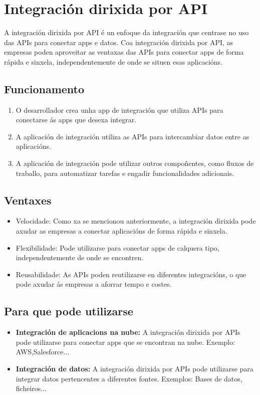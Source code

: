 \section{Integración dirixida por API}
\begin{flushleft}
    A integración dirixida por API é un enfoque da integración que centrase no uso das APIs para conectar apps e datos. Coa integración dirixida por API, as empresas poden aproveitar as ventaxas das APIs para conectar apps de forma rápida e sinxela, independentemente de onde se situen esas aplicacións. \\
    \subsection{Funcionamento }
    \begin{enumerate}
        \item O desarrollador crea unha app de integración que utiliza APIs para conectarse ás apps que desexa integrar.
        \item A aplicación de integración utiliza as APIs para intercambiar datos entre as aplicacións.
        \item A aplicación de integración pode utilizar outros compoñentes, como fluxos de traballo, para automatizar tarefas e engadir funcionalidades adicionais.
    \end{enumerate}
    \subsection{Ventaxes }
    \begin{itemize}
        \item Velocidade: Como xa se mencionou anteriormente, a integración dirixida pode axudar as empresas a conectar aplicacións de forma rápida e sinxela.
        \item Flexibilidade: Pode utilizarse para conectar apps de calquera tipo, independentemente de onde se encontren.
        \item Reusabilidade: As APIs poden reutilizarse en diferentes integracións, o que pode axudar ás empresas a aforrar tempo e costes. 
    \end{itemize}
    \subsection{Para que pode utilizarse }
    \begin{itemize}
        \item \textbf{Integración de aplicacions na nube: } A integración dirixida por APIs pode utilizarse para conectar apps que se encontran na nube. Exemplo: AWS,Salesforce...
        \item \textbf{Integración de datos: } A integración dirixida por APIs pode utilizarse para integrar datos pertencentes a diferentes fontes. Exemplos: Bases de datos, ficheiros...
    \end{itemize}

\end{flushleft}
